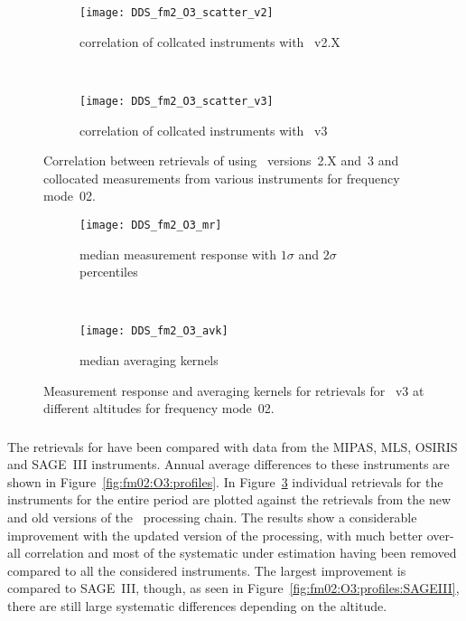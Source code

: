 \begin{figure}[htpb]
    \centering
    \begin{subfigure}[b]{0.49\textwidth}
        \texttt{[image: DDS\_fm2\_O3\_scatter\_v2]}
        \caption{correlation of collcated instruments with \smr~v2.X}
        \label{fig:fm02:O3:scatter:v2}
    \end{subfigure}
    \,
    \begin{subfigure}[b]{0.49\textwidth}
        \texttt{[image: DDS\_fm2\_O3\_scatter\_v3]}
        \caption{correlation of collcated instruments with \smr~v3}
        \label{fig:fm02:O3:scatter:v3}
    \end{subfigure}
    \caption{Correlation between retrievals of  using \smr\
    versions~2.X and~3 and collocated measurements from various instruments
    for frequency mode~02.}
    \label{fig:fm02:O3:scatter}
\end{figure}

\begin{figure}[htpb]
    \centering
    \begin{subfigure}[b]{0.49\textwidth}
        \texttt{[image: DDS\_fm2\_O3\_mr]}
        \caption{median measurement response with $1\sigma$ and $2\sigma$
        percentiles}
        \label{fig:fm02:O3:mr}
    \end{subfigure}
    \,
    \begin{subfigure}[b]{0.49\textwidth}
        \texttt{[image: DDS\_fm2\_O3\_avk]}
        \caption{median averaging kernels}
        \label{fig:fm02:O3:avk}
    \end{subfigure}
    \caption{Measurement response and averaging kernels for 
    retrievals for \smr~v3 at different altitudes for frequency mode~02.}
    \label{fig:fm02:O3:mr_avk}
\end{figure}

\subsubsection{}
\label{sec:fm02:comparison:O3}
The retrievals for \chem{O_3} have been compared with data from the MIPAS, MLS,
OSIRIS and SAGE~III instruments. Annual average differences to these
instruments are shown in Figure~\ref{fig:fm02:O3:profiles}. In
Figure~\ref{fig:fm02:O3:scatter} individual retrievals for the instruments for
the entire period are plotted against the retrievals from the new and old
versions of the \smr\ processing chain. The results show a considerable
improvement with the updated version of the processing, with much better
over-all correlation and most of the systematic under estimation having been
removed compared to all the considered instruments. The largest improvement is
compared to SAGE~III, though, as seen in
Figure~\ref{fig:fm02:O3:profiles:SAGEIII}, there are still large systematic
differences depending on the altitude.



